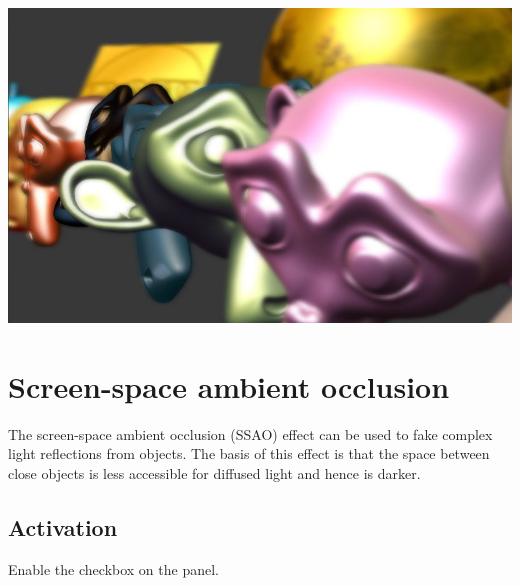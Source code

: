 \documentclass[a4paper,12pt,oneside]{sphinxmanual}
\begin{document}
{\hfill\includegraphics[width=1.000\linewidth]{dof.jpg}\hfill}

\begin{DUlineblock}{0em}
\item[] 
\end{DUlineblock}


\section{Screen-space ambient occlusion}
\label{postprocessing_effects:index-2}\label{postprocessing_effects:ssao}\label{postprocessing_effects:id8}
The screen-space ambient occlusion (SSAO) effect can be used to fake complex light reflections from objects. The basis of this effect is that the space between close objects is less accessible for diffused light and hence is darker.


\subsection{Activation}
\label{postprocessing_effects:id9}
Enable the  checkbox on the  panel.
\end{document}
